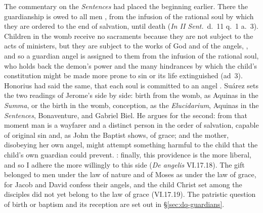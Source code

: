 The commentary on the \emph{Sentences} had placed the beginning earlier.
There the guardianship is owed to all men ,
from the infusion of the rational soul by which they are ordered to the end
of salvation, until death (\emph{In II Sent.}\ d.~11 q.~1 a.~3). Children in
the womb receive no sacraments because they are not subject to the acts of
ministers, but they are subject to the works of God and of the angels,
, and so a guardian angel is assigned to them from the infusion
of the rational soul, who holds back the demon's power and the many
hindrances by which the child's constitution might be made more prone to sin
or its life extinguished (ad~3). Honorius had said the same, that each soul
is committed to an angel . Suárez sets the two
readings of Jerome's  side by side: birth from the womb, as
Aquinas in the \emph{Summa}, or the birth in the womb, conception, as the
\emph{Elucidarium}, Aquinas in the \emph{Sentences}, Bonaventure, and Gabriel
Biel. He argues for the second: from that moment man is a wayfarer and a
distinct person in the order of salvation, capable of original sin and, as
John the Baptist shows, of grace; and the mother, disobeying her own angel,
might attempt something harmful to the child that the child's own guardian
could prevent.
: finally, this providence is the more liberal, and so I adhere the
more willingly to this side (\emph{De angelis} VI.17.18). The gift belonged
to men under the law of nature and of Moses as under the law of grace, for
Jacob and David confess their angels, and the child Christ set among the
disciples did not yet belong to the law of grace (VI.17.19). The patristic question of birth or
baptism and its reception are set out in \S\ref{sec:dq-guardians}.

